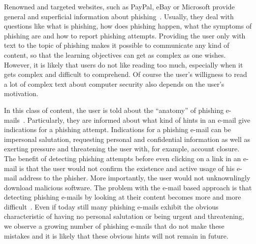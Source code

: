 \begin{description}[leftmargin=0cm]
	\item[General Knowledge Transfer] Renowned and targeted websites, such as PayPal, eBay or Microsoft provide general and superficial information about phishing~\cite{generalknowledgemicrosoft, generalknowledgepaypal, generalknowledgeebay}.
	Usually, they deal with questions like what is phishing, how does phishing happen, what the symptoms of phishing are and how to report phishing attempts.
 Providing the user only with text to the topic of phishing makes it possible to communicate any kind of content, so that the learning objectives can get as complex as one wishes.
 However, it is likely that users do not like reading too much, especially when it gets complex and difficult to comprehend.
 Of course the user's willigness to read a lot of complex text about computer security also depends on the user's motivation. 
	\item[E-Mail Based Knowledge] In this class of content, the user is told about the ``anatomy'' of phishing e-mails~\cite{antiphishingphyllis, sonicwall}. Particularly, they are informed about what kind of hints in an e-mail give indications for a phishing attempt.
 Indications for a phishing e-mail can be impersonal salutation, requesting personal and confidential information as well as exerting pressure and threatening the user with, for example, account closure.
 The benefit of detecting phishing attempts before even clicking on a link in an e-mail is that the user would not confirm the existence and active usage of his e-mail address to the phisher.
 More importantly, the user would not unknownlingly download malicious software.
 The problem with the e-mail based approach is that detecting phishing e-mails by looking at their content becomes more and more difficult~\cite{microsoftphishing,spamfighter}. Even if today still many phishing e-mails exhibit the obvious characteristic of having no personal salutation or being urgent and threatening, we observe a growing number of phishing e-mails that do not make these mistakes and it is likely that these obvious hints will not remain in future.


\end{description}
